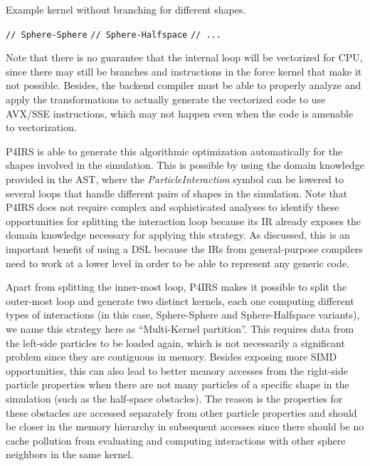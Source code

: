 \documentclass[Afour,sageh,times]{sagej}
\newcommand{\RMchange}[1]{{\color{blue} #1}}
\begin{document}
\begin{algorithm}[H]
  \caption{Example kernel without branching for different shapes.}
  \label{alg:no_branching}
  \begin{algorithmic}[1]
        \State \texttt{// Sphere-Sphere}
      \EndFor
        \State \texttt{// Sphere-Halfspace}
      \EndFor
      \State \texttt{// ...}
    \EndFor
  \end{algorithmic}
\end{algorithm}

Note that there is no guarantee that the internal loop will be vectorized for CPU, since there may still be branches and instructions in the force kernel that make it not possible.
Besides, the backend compiler must be able to properly analyze and apply the transformations to actually generate the vectorized code to use AVX/SSE instructions, which may not happen even when the code is amenable to vectorization.

\RMchange{P4IRS is able to generate this algorithmic optimization automatically for the shapes involved in the simulation.
This is possible by using the domain knowledge provided in the AST, where the \emph{ParticleInteraction} symbol can be lowered to several loops that handle different pairs of shapes in the simulation.
Note that P4IRS does not require complex and sophisticated analyses to identify these opportunities for splitting the interaction loop because its \ac{IR} already exposes the domain knowledge necessary for applying this strategy.
As discussed, this is an important benefit of using a \ac{DSL} because the \ac{IR}s from general-purpose compilers need to work at a lower level in order to be able to represent any generic code.}

Apart from splitting the inner-most loop, P4IRS makes it possible to split the outer-most loop and generate two distinct kernels, each one computing different types of interactions (in this case, Sphere-Sphere and Sphere-Halfspace variants), we name this strategy here as ``Multi-Kernel partition''.
This requires data from the left-side particles to be loaded again, which is not necessarily a significant problem since they are contiguous in memory.
Besides exposing more SIMD opportunities, this can also lead to better memory accesses from the right-side particle properties when there are not many particles of a specific shape in the simulation (such as the half-space obstacles).
The reason is the properties for these obstacles are accessed separately from other particle properties and should be closer in the memory hierarchy in subsequent accesses since there should be no cache pollution from evaluating and computing interactions with other sphere neighbors in the same kernel.
\end{document}
